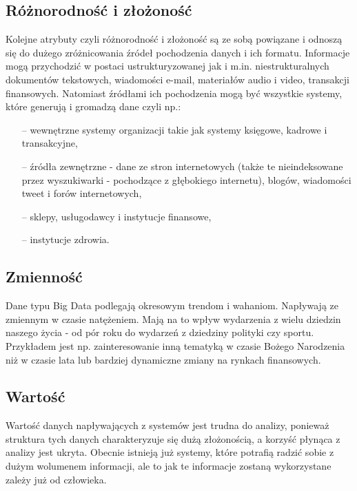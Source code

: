 \subsection{Różnorodność i złożoność}
Kolejne atrybuty czyli różnorodność i złożoność są ze sobą powiązane i odnoszą się do dużego zróżnicowania źródeł pochodzenia danych i ich formatu. Informacje mogą przychodzić w postaci ustrukturyzowanej jak i m.in. niestrukturalnych dokumentów tekstowych, wiadomości e-mail, materiałów audio i video, transakcji finansowych. Natomiast źródłami ich pochodzenia mogą być wszystkie systemy, które generują i gromadzą dane czyli np.: 

\begin{itemize}
	\item[--] wewnętrzne systemy organizacji takie jak systemy księgowe, kadrowe i transakcyjne,
	\item[--] źródła zewnętrzne - dane ze stron internetowych (także te nieindeksowane przez wyszukiwarki - pochodzące z głębokiego internetu), blogów, wiadomości tweet i forów internetowych,
	\item [--] sklepy, usługodawcy i instytucje finansowe,
	\item[--] instytucje zdrowia.
\end{itemize}

\subsection{Zmienność}
Dane typu Big Data podlegają okresowym trendom i wahaniom. Napływają ze zmiennym w czasie natężeniem. Mają na to wpływ wydarzenia z wielu dziedzin naszego życia - od pór roku do wydarzeń z dziedziny polityki czy sportu. Przykładem jest np. zainteresowanie inną tematyką w czasie Bożego Narodzenia niż w czasie lata lub bardziej dynamiczne zmiany na rynkach finansowych.

\subsection{Wartość}
Wartość danych napływających z systemów jest trudna do analizy, ponieważ struktura tych danych charakteryzuje się dużą złożonością, a korzyść płynąca z analizy jest ukryta. Obecnie istnieją już systemy, które potrafią radzić sobie z dużym wolumenem informacji, ale to jak te informacje zostaną wykorzystane zależy już od człowieka.

